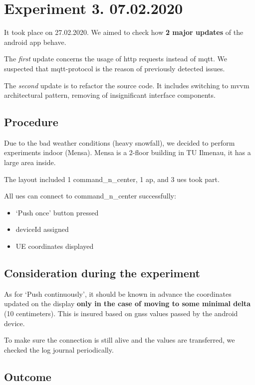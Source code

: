 \section{Experiment 3. 07.02.2020}\label{experiment-3.-07.02.2020}

It took place on 27.02.2020. We aimed to check how \textbf{2 major updates} of the \gls{android} app behave.

The \emph{first} update concerns the usage of \gls{http} requests instead of \gls{mqtt}. We suspected that \gls{mqtt}-protocol is the reason of previously detected issues.

The \emph{second} update is to refactor the source code. It includes switching to \gls{mvvm} architectural pattern, removing of insignificant interface components.

\subsection{Procedure}

Due to the bad weather conditions (heavy snowfall), we decided to perform experiments indoor (Mensa). Mensa is a 2-floor building in TU Ilmenau, it has a large area inside.

The layout included 1 \gls{command_n_center}, 1 \gls{ap}, and 3 \glspl{ue} took part.

All \glspl{ue} can connect to \gls{command_n_center} successfully:

\begin{itemize}
	\tightlist
	\item
	`Push once' button pressed
	\item
	deviceId assigned
	\item
	UE coordinates displayed
\end{itemize}

\subsection{Consideration during the experiment}

As for `Push continuously', it should be known in advance the
coordinates updated on the display \textbf{only in the case of moving to some minimal delta} (10 centimeters). This is insured based on \gls{gnss} values passed by the \gls{android} device.

To make sure the connection is still alive and the values are transferred, we checked the log journal periodically.

\subsection{Outcome}

